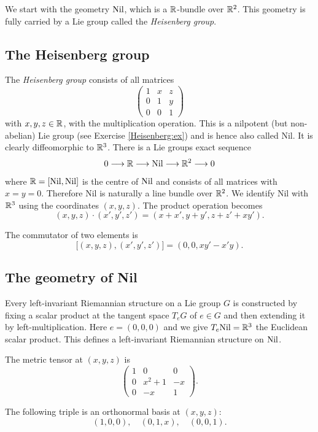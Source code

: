 We start with the geometry ${\rm Nil}$, which is a $\mathbb{R}$-bundle over $\mathbb{R}^2$. This geometry is fully carried by a Lie group called the \emph{Heisenberg group}.

\subsection{The Heisenberg group} 
The \emph{Heisenberg group} consists of all matrices
$$\begin{pmatrix} 1 & x & z \\ 0 & 1 & y \\ 0 & 0 & 1 \end{pmatrix}$$
with $x, y, z \in \mathbb{R}$, with the multiplication operation. This is a nilpotent (but non-abelian) Lie group (see Exercise \ref{Heisenberg:ex}) and is hence also called Nil. It is clearly diffeomorphic to $\mathbb{R}^3$.
There is a Lie groups exact sequence
$$ 0 \longrightarrow \mathbb{R} \longrightarrow {\rm Nil} \longrightarrow \mathbb{R}^2 \longrightarrow 0$$
where $\mathbb{R} = [{\rm Nil}, {\rm Nil}] $ is the centre of ${\rm Nil}$ and consists of all matrices with $x=y=0$. Therefore Nil is naturally a line bundle over $\mathbb{R}^2$.
We identify Nil with $\mathbb{R}^3$ using the coordinates $(x,y,z)$. The product operation becomes
$$(x,y,z) \cdot (x',y',z') = (x+x', y+y', z+z'+xy').$$
\begin{ex} \label{Nil:commutator:ex}
The commutator of two elements is
$$\big[(x,y,z), (x',y',z')\big] = (0,0,xy'-x'y).$$
\end{ex}

\subsection{The geometry of Nil}
Every left-invariant Riemannian structure on a Lie group $G$ is constructed by fixing a scalar product at the tangent space $T_e G$ of $e\in G$ and then extending it by left-multiplication. Here $e=(0,0,0)$ and we give $T_e{\rm Nil} = \mathbb{R}^3$ the Euclidean scalar product. This defines a left-invariant Riemannian structure on ${\rm Nil}$.

\begin{ex} \label{metric:tensor:Nil:ex}
The metric tensor at $(x,y,z)$ is
$$
\begin{pmatrix}
1 & 0 & 0 \\
0 & x^2 + 1 & -x \\
0 & -x & 1
\end{pmatrix}.
$$
\end{ex}
The following triple is an orthonormal basis at $(x,y,z)$:
\begin{equation} \label{orthonormal:eqn}
(1,0,0), \quad (0,1,x), \quad (0,0,1).
\end{equation}

